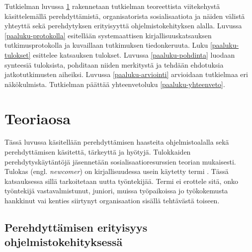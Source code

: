 \documentclass[utf8]{gradu3}
\begin{document}
Tutkielman luvussa \ref{paaluku-teoria} rakennetaan tutkielman teoreettista viitekehystä käsittelemällä perehdyttämistä, organisatorista sosialisaatiota ja näiden välistä yhteyttä sekä perehdytyksen erityisyyttä ohjelmistokehityksen alalla. Luvussa \ref{paaluku-protokolla} esitellään systemaattisen kirjallisuuskatsauksen tutkimusprotokolla ja kuvaillaan tutkimuksen tiedonkeruuta. Luku \ref{paaluku-tulokset} esittelee katsauksen tulokset. Luvussa \ref{paaluku-pohdinta} luodaan synteesiä tuloksista, pohditaan niiden merkitystä ja tehdään ehdotuksia jatkotutkimusten aiheiksi. Luvussa \ref{paaluku-arviointi} arvioidaan tutkielmaa eri näkökulmista. Tutkielman päättää yhteenvetoluku \ref{paaluku-yhteenveto}.

\chapter{Teoriaosa}
\label{paaluku-teoria}

Tässä luvussa käsitellään perehdyttämisen haasteita ohjelmistoalalla sekä perehdyttämisen käsitettä, tärkeyttä ja hyötyjä. Tulokkaiden perehdytyskäytäntöjä jäsennetään sosialisaatioresurssien teorian \parencite{saks-gruman-2012} mukaisesti. Tulokas (engl. \textit{newcomer}) on kirjallisuudessa usein käytetty termi %
\parencites%
    [mm.][]{matturro-ym-2017}%
    {bauer-erdogan-2012}%
    {begel-simon-2008-all-over-again}%
    {steinmacher-ym-2015}%
    {britto-ym-2019}%
\relax.
%
Tässä katsauksessa sillä tarkoitetaan uutta työntekijää. Termi ei erottele sitä, onko työntekijä vastavalmistunut, juniori, muissa työpaikoissa jo työkokemusta hankkinut vai kenties siirtynyt organisaation sisällä tehtävästä toiseen.

\section{Perehdyttämisen erityisyys ohjelmistokehityksessä}
\label{luku-perehdyttämisen-erityisyys-ohjelmistoalalla}
\end{document}
